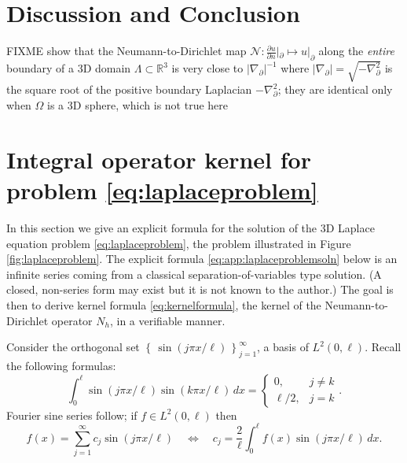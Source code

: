 \documentclass[letterpaper,final,12pt,reqno]{amsart}
\theoremstyle{cstyle}
\theoremstyle{cstyle*}
\theoremstyle{dstyle}
\numberwithin{equation}{section}
\newcommand{\RR}{\mathbb{R}}
\newcommand{\grad}{\nabla}
\begin{document}
\section{Discussion and Conclusion} \label{sec:conclusion}

FIXME \cite{Girouardetal2022} show that the Neumann-to-Dirichlet map $\mathcal{N}:\frac{\partial u}{\partial n}|_{\partial} \mapsto u|_{\partial}$ along the \emph{entire} boundary of a 3D domain $\Lambda \subset \RR^3$ is very close to $|\grad_{\partial}|^{-1}$ where $|\grad_{\partial}| = \sqrt{-\grad_{\partial}^2}$ is the square root of the positive boundary Laplacian $-\grad_{\partial}^2$; they are identical only when $\Omega$ is a 3D sphere, which is not true here





\appendix
\section{Integral operator kernel for problem \eqref{eq:laplaceproblem}}

In this section we give an explicit formula for the solution of the 3D Laplace equation problem \eqref{eq:laplaceproblem}, the problem illustrated in Figure \ref{fig:laplaceproblem}.  The explicit formula \eqref{eq:app:laplaceproblemsoln} below is an infinite series coming from a classical separation-of-variables type solution.  (A closed, non-series form may exist but it is not known to the author.)  The goal is then to derive kernel formula \eqref{eq:kernelformula}, the kernel of the Neumann-to-Dirichlet operator $N_h$, in a verifiable manner.

Consider the orthogonal set $\left\{\,\sin(j\pi x/\ell)\,\right\}_{j=1}^\infty$, a basis of $L^2(0,\ell)$.  Recall the following formulas:
    $$\int_0^\ell \sin(j\pi x/\ell) \sin(k\pi x/\ell)\,dx = \begin{cases} 0, & j \ne k \\ \ell/2, & j=k \end{cases}.$$
Fourier sine series follow; if $f \in L^2(0,\ell)$ then
    $$f(x) = \sum_{j=1}^\infty c_j \sin(j\pi x/\ell) \quad \iff \quad c_j = \frac{2}{\ell} \int_0^\ell f(x) \sin(j\pi x/\ell)\,dx.$$
\end{document}
